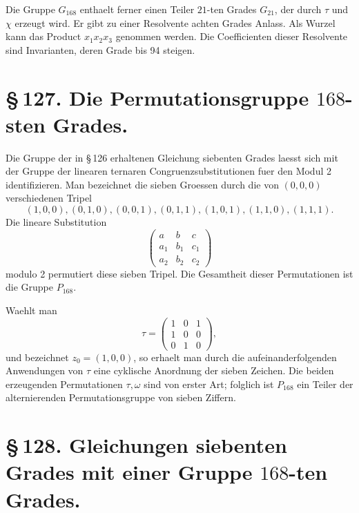 \documentclass[11pt]{article}
\begin{document}
Die Gruppe \(G_{168}\) enthaelt ferner einen Teiler \(21\)-ten Grades \(G_{21}\), der durch \(\tau\) und \(\chi\) erzeugt wird. Er gibt zu einer Resolvente achten Grades Anlass. Als Wurzel kann das Product \(x_1x_2x_3\) genommen werden. Die Coefficienten dieser Resolvente sind Invarianten, deren Grade bis 94 steigen.

\section*{\S\,127. Die Permutationsgruppe \(168\)-sten Grades.}

Die Gruppe der in \S\,126 erhaltenen Gleichung siebenten Grades laesst sich mit der Gruppe der linearen ternaren Congruenzsubstitutionen fuer den Modul 2 identifizieren. Man bezeichnet die sieben Groessen durch die von \((0,0,0)\) verschiedenen Tripel
\begin{equation}
(1,0,0),(0,1,0),(0,0,1),(0,1,1),(1,0,1),(1,1,0),(1,1,1).
\tag{1}
\end{equation}
Die lineare Substitution
\begin{equation}
\begin{pmatrix}
a&b&c\\ a_1&b_1&c_1\\ a_2&b_2&c_2
\end{pmatrix}
\tag{2}
\end{equation}
modulo 2 permutiert diese sieben Tripel. Die Gesamtheit dieser Permutationen ist die Gruppe \(P_{168}\).

Waehlt man
\begin{equation}
\tau=\begin{pmatrix}1&0&1\\1&0&0\\0&1&0\end{pmatrix},
\tag{3}
\end{equation}
und bezeichnet \(z_0=(1,0,0)\), so erhaelt man durch die aufeinanderfolgenden Anwendungen von \(\tau\) eine cyklische Anordnung der sieben Zeichen. Die beiden erzeugenden Permutationen \(\tau,\omega\) sind von erster Art; folglich ist \(P_{168}\) ein Teiler der alternierenden Permutationsgruppe von sieben Ziffern.

\section*{\S\,128. Gleichungen siebenten Grades mit einer Gruppe \(168\)-ten Grades.}
\end{document}
